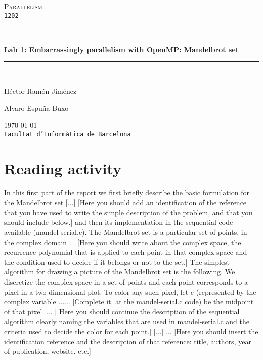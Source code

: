 \documentclass[a4paper,11pt]{article}
\begin{document}
\begin{titlepage}
\begin{center}
\textsc{\Large Parallelism}
\\
\texttt{1202}
\\[1.5cm]
\rule{\linewidth}{0.5mm}
\\[0.4cm]
{\huge
\bfseries
Lab 1: Embarrassingly parallelism with OpenMP: Mandelbrot set
\\[0.4cm]
}
\rule{\linewidth}{0.5mm}
\\[2.5cm]
\begin{minipage}{0.4\textwidth}
\begin{flushleft}
\large
Héctor Ramón Jiménez
\end{flushleft}
\end{minipage}
\begin{minipage}{0.4\textwidth}
\begin{flushright}
\large
Alvaro Espuña Buxo
\end{flushright}
\end{minipage}
\vfill
{\large
\today
}
\\
{\large
\texttt{Facultat d'Informàtica de Barcelona}
}
\end{center}
\end{titlepage}
\section{Reading activity}
In this first part of the report we first briefly describe the basic formulation for the Mandelbrot set [...]
    [Here you should add an identification of the reference that you have used to write the simple description
    of the problem, and that you should include below.] and then its implementation in the sequential code
    available (mandel-serial.c). The Mandelbrot set is a particular set of points, in the complex domain ...
    [Here you should write about the complex space, the recurrence polynomial that is applied to each point
    in that complex space and the condition used to decide if it belongs or not to the set.]
    The simplest algorithm for drawing a picture of the Mandelbrot set is the following. We discretize the
    complex space in a set of points and each point corresponds to a pixel in a two dimensional plot. To color
    any such pixel, let c (represented by the complex variable ...... [Complete it] at the mandel-serial.c
    code) be the midpoint of that pixel. ... [ Here you should continue the description of the sequential
    algorithm clearly naming the variables that are used in mandel-serial.c and the criteria used to decide
    the color for each point.]
    [...] ... [Here you should insert the identification reference and the description of that reference: title,
    authors, year of publication, website, etc.]
\end{document}
